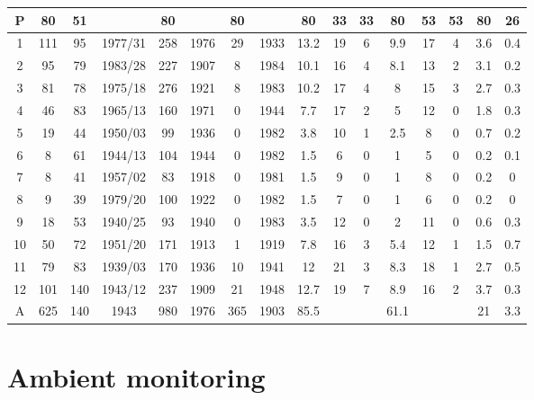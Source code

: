 \documentclass{nwureport}
\begin{document}
\begin{table}
\begin{center}
\begin{tabular}{ c c c c c c c c c c c c c c c c }
\midrule 
P&80&51&&80&&80&&80&33&33&80&53&53&80&26\\
\midrule 
1&111&95&1977/31&258&1976&29&1933&13.2&19&6&9.9&17&4&3.6&0.4\\
2&95&79&1983/28&227&1907&8&1984&10.1&16&4&8.1&13&2&3.1&0.2\\
3&81&78&1975/18&276&1921&8&1983&10.2&17&4&8&15&3&2.7&0.3\\
4&46&83&1965/13&160&1971&0&1944&7.7&17&2&5&12&0&1.8&0.3\\
5&19&44&1950/03&99&1936&0&1982&3.8&10&1&2.5&8&0&0.7&0.2\\
6&8&61&1944/13&104&1944&0&1982&1.5&6&0&1&5&0&0.2&0.1\\
7&8&41&1957/02&83&1918&0&1981&1.5&9&0&1&8&0&0.2&0\\
8&9&39&1979/20&100&1922&0&1982&1.5&7&0&1&6&0&0.2&0\\
9&18&53&1940/25&93&1940&0&1983&3.5&12&0&2&11&0&0.6&0.3\\
10&50&72&1951/20&171&1913&1&1919&7.8&16&3&5.4&12&1&1.5&0.7\\
11&79&83&1939/03&170&1936&10&1941&12&21&3&8.3&18&1&2.7&0.5\\
12&101&140&1943/12&237&1909&21&1948&12.7&19&7&8.9&16&2&3.7&0.3\\
\midrule 
A&625&140&1943&980&1976&365&1903&85.5&&&61.1&&&21&3.3\\
\bottomrule
\end{tabular}
\end{center}
\end{table}


\chapter{Ambient monitoring}
\label{sec:ambient}
\end{document}
